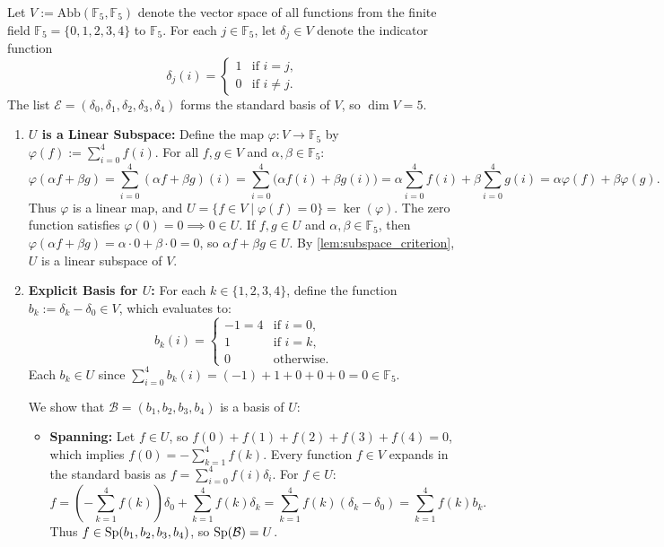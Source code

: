 \begin{exercisesolution}
\label{sol:basis_f5_functions_subspace}
Let $V := \mathrm{Abb}(\mathbb{F}_5, \mathbb{F}_5)$ denote the vector space of all functions from the finite field $\mathbb{F}_5 = \{0, 1, 2, 3, 4\}$ to $\mathbb{F}_5$. For each $j \in \mathbb{F}_5$, let $\delta_j \in V$ denote the indicator function
\[
\delta_j(i) = \begin{cases} 1 & \text{if } i = j, \\ 0 & \text{if } i \ne j. \end{cases}
\]
The list $\mathcal{E} = (\delta_0, \delta_1, \delta_2, \delta_3, \delta_4)$ forms the standard basis of $V$, so $\dim V = 5$.

\begin{enumerate}[label=\textbf{(\alph*)}]
    \item \textbf{$U$ is a Linear Subspace:}
    Define the map $\varphi \colon V \to \mathbb{F}_5$ by $\varphi(f) := \sum_{i=0}^4 f(i)$.
    For all $f, g \in V$ and $\alpha, \beta \in \mathbb{F}_5$:
    \[
    \varphi(\alpha f + \beta g) = \sum_{i=0}^4 (\alpha f + \beta g)(i) = \sum_{i=0}^4 \bigl(\alpha f(i) + \beta g(i)\bigr) = \alpha \sum_{i=0}^4 f(i) + \beta \sum_{i=0}^4 g(i) = \alpha \varphi(f) + \beta \varphi(g).
    \]
    Thus $\varphi$ is a linear map, and $U = \{f \in V \mid \varphi(f) = 0\} = \ker(\varphi)$.
    The zero function satisfies $\varphi(0) = 0 \implies 0 \in U$. If $f, g \in U$ and $\alpha, \beta \in \mathbb{F}_5$, then $\varphi(\alpha f + \beta g) = \alpha \cdot 0 + \beta \cdot 0 = 0$, so $\alpha f + \beta g \in U$.
    By \cref{lem:subspace_criterion}, $U$ is a linear subspace of $V$.

    \item \textbf{Explicit Basis for $U$:}
    For each $k \in \{1, 2, 3, 4\}$, define the function $b_k := \delta_k - \delta_0 \in V$, which evaluates to:
    \[
    b_k(i) = \begin{cases} -1 = 4 & \text{if } i = 0, \\ 1 & \text{if } i = k, \\ 0 & \text{otherwise.} \end{cases}
    \]
    Each $b_k \in U$ since $\sum_{i=0}^4 b_k(i) = (-1) + 1 + 0 + 0 + 0 = 0 \in \mathbb{F}_5$.
    
    We show that $\mathcal{B} = (b_1, b_2, b_3, b_4)$ is a basis of $U$:
    \begin{itemize}
        \item \textbf{Spanning:} Let $f \in U$, so $f(0) + f(1) + f(2) + f(3) + f(4) = 0$, which implies $f(0) = -\sum_{k=1}^4 f(k)$.
        Every function $f \in V$ expands in the standard basis as $f = \sum_{i=0}^4 f(i) \delta_i$. For $f \in U$:
        \[
        f = \left(-\sum_{k=1}^4 f(k)\right) \delta_0 + \sum_{k=1}^4 f(k) \delta_k = \sum_{k=1}^4 f(k) (\delta_k - \delta_0) = \sum_{k=1}^4 f(k) b_k.
        \]
        Thus $f \in \operatorname{Sp}(b_1, b_2, b_3, b_4)$, so $\operatorname{Sp}(\mathcal{B}) = U$.


\end{itemize}
\end{enumerate}
\end{exercisesolution}
